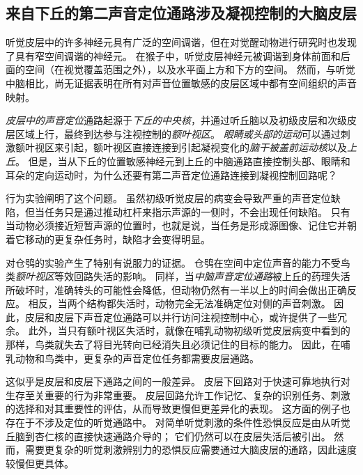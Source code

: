 \subsection{来自下丘的第二声音定位通路涉及凝视控制的大脑皮层}

听觉皮层中的许多神经元具有广泛的空间调谐，但在对觉醒动物进行研究时也发现了具有窄空间调谐的神经元。
在猴子中，听觉皮层神经元被调谐到身体前面和后面的空间（在视觉覆盖范围之外），以及水平面上方和下方的空间。
然而，与听觉中脑相比，尚无证据表明在所有对声音位置敏感的皮层区域中都有空间组织的声音映射。


\textit{皮层中的声音定位}通路起源于\textit{下丘的中央核}，并通过听丘脑以及初级皮层和次级皮层区域上行，最终到达参与注视控制的\textit{额叶视区}。
\textit{眼睛或头部的运动}可以通过刺激额叶视区来引起，额叶视区直接连接到引起凝视变化的\textit{脑干被盖前运动核}以及\textit{上丘}。
但是，当从下丘的位置敏感神经元到上丘的中脑通路直接控制头部、眼睛和耳朵的定向运动时，为什么还要有第二声音定位通路连接到凝视控制回路呢？


行为实验阐明了这个问题。
虽然初级听觉皮层的病变会导致严重的声音定位缺陷，但当任务只是通过推动杠杆来指示声源的一侧时，不会出现任何缺陷。
只有当动物必须接近短暂声源的位置时，也就是说，当任务是形成源图像、记住它并朝着它移动的更复杂任务时，缺陷才会变得明显。



对仓鸮的实验产生了特别有说服力的证据。
仓鸮在空间中定位声音的能力不受鸟类\textit{额叶视区}等效回路失活的影响。
同样，当\textit{中脑声音定位通路}被上丘的药理失活所破坏时，准确转头的可能性会降低，但动物仍然有一半以上的时间会做出正确反应。
相反，当两个结构都失活时，动物完全无法准确定位对侧的声音刺激。
因此，皮层和皮层下声音定位通路可以并行访问注视控制中心，或许提供了一些冗余。
此外，当只有额叶视区失活时，就像在哺乳动物初级听觉皮层病变中看到的那样，鸟类就失去了将目光转向已经消失且必须记住的目标的能力。
因此，在哺乳动物和鸟类中，更复杂的声音定位任务都需要皮层通路。


这似乎是皮层和皮层下通路之间的一般差异。
皮层下回路对于快速可靠地执行对生存至关重要的行为非常重要。
皮层回路允许工作记忆、复杂的识别任务、刺激的选择和对其重要性的评估，从而导致更慢但更差异化的表现。
这方面的例子也存在于不涉及定位的听觉通路中。
对简单听觉刺激的条件性恐惧反应是由从听觉丘脑到杏仁核的直接快速通路介导的；
它们仍然可以在皮层失活后被引出。
然而，需要更复杂的听觉刺激辨别力的恐惧反应需要通过大脑皮层的通路，因此速度较慢但更具体。



